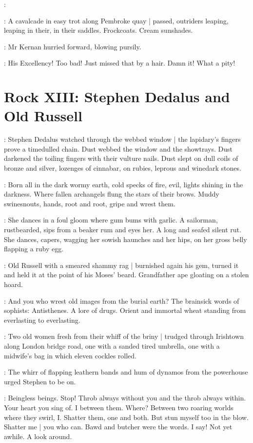 :

:
A cavalcade in easy trot along Pembroke quay |
passed,
outriders leaping, leaping in their, in their saddles.
Frockcoats.
Cream sunshades.

:
Mr Kernan hurried forward,
blowing pursily.

:
His Excellency!
Too bad!
Just missed that by a hair.
Damn it!
What a pity!


\section*{Rock XIII: Stephen Dedalus and Old Russell}


:
Stephen Dedalus watched through the webbed window |
the lapidary's fingers prove a timedulled chain.
Dust webbed the window and the showtrays.
Dust darkened the toiling fingers with their vulture nails.
Dust slept on dull coils of bronze and silver,
lozenges of cinnabar,
on rubies,
leprous and winedark stones.

\StephenInt:
Born all in the dark wormy earth,
cold specks of fire,
evil, lights shining in the darkness.
Where fallen archangels flung the stars of their brows.
Muddy swinesnouts,
hands,
root and root,
gripe and wrest them.

\StephenInt:
She dances in a foul gloom where gum bums with garlic.
A sailorman, rustbearded, sips from a beaker rum and eyes her.
A long and seafed silent rut.
She dances, capers,
wagging her sowish haunches and her hips,
on her gross belly flapping a ruby egg.

:
Old Russell with a smeared shammy rag |
burnished again his gem,
turned it
and held it at the point of his Moses' beard.
Grandfather ape gloating on a stolen hoard.

\StephenInt:
And you who wrest old images from the burial earth?
The brainsick words of sophists:
Antisthenes.
A lore of drugs.
Orient and immortal wheat
standing from everlasting to everlasting.

:
Two old women
fresh from their whiff of the briny |
trudged through Irishtown along London bridge road,
one with a sanded tired umbrella,
one with a midwife's bag
in which eleven cockles rolled.

:
The whirr of flapping leathern bands
and hum of dynamos from the powerhouse
urged Stephen to be on.

\StephenInt:
Beingless beings.
Stop!
Throb always without you
and the throb always within.
Your heart you sing of.
I between them.
Where?
Between two roaring worlds where they swirl, I.
Shatter them, one and both.
But stun myself too in the blow.
Shatter me |
you who can.
Bawd and butcher were the words.
I say!
Not yet awhile.
A look around.

